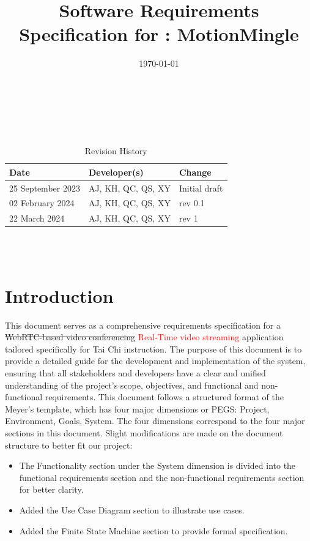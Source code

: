 \documentclass[12pt]{article}
\begin{document}
\title{Software Requirements Specification for \progname: MotionMingle} 
\author{\authname}
\date{\today}
	
\maketitle

~\newpage


\tableofcontents

~\newpage

\begin{table}[hp]
  \caption{Revision History} \label{TblRevisionHistory}
  \begin{tabularx}{\textwidth}{llX}
    \toprule
    \textbf{Date} & \textbf{Developer(s)} & \textbf{Change}\\
    \midrule
    25 September 2023 & AJ, KH, QC, QS, XY & Initial draft \\
    02 February 2024 & AJ, KH, QC, QS, XY & rev 0.1 \\
    22 March 2024 & AJ, KH, QC, QS, XY & rev 1 \\
    \bottomrule
  \end{tabularx}
\end{table}

~\\

~\newpage
\section{Introduction}
This document serves as a comprehensive requirements specification for a \sout{WebRTC-based video conferencing} \textcolor{red}{Real-Time video streaming} application tailored specifically for Tai Chi instruction. The purpose of this document is to provide a detailed guide for the development and implementation of the system, ensuring that all stakeholders and developers have a clear and unified understanding of the project’s scope, objectives, and functional and non-functional requirements. This document follows a structured format of the Meyer’s template, which has four major dimensions or PEGS: Project, Environment, Goals, System. The four dimensions correspond to the four major sections in this document. Slight modifications are made on the document structure to better fit our project:
\begin{itemize}
  \item The Functionality section under the System dimension is divided into the functional requirements section and the non-functional requirements section for better clarity.
  \item Added the Use Case Diagram section to illustrate use cases.
  \item Added the Finite State Machine section to provide formal specification.
\end{itemize}
\end{document}

